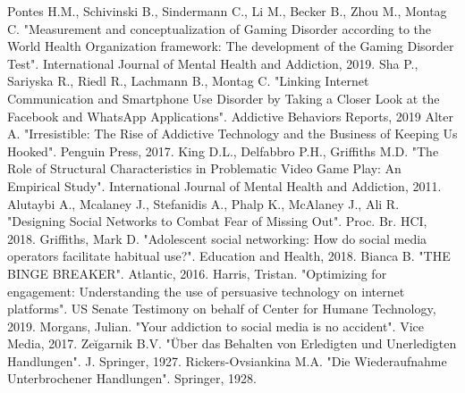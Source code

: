 \documentclass[conference]{IEEEtran}
\begin{document}
\begin{thebibliography}{00}
 Pontes H.M., Schivinski B., Sindermann C., Li M., Becker B., Zhou M., Montag C. "Measurement and conceptualization of Gaming Disorder according to the World Health Organization framework: The development of the Gaming Disorder Test". International Journal of Mental Health and Addiction, 2019.
 Sha P., Sariyska R., Riedl R., Lachmann B., Montag C. "Linking Internet Communication and Smartphone Use Disorder by Taking a Closer Look at the Facebook and WhatsApp Applications". Addictive Behaviors Reports, 2019
 Alter A. "Irresistible: The Rise of Addictive Technology and the Business of Keeping Us Hooked". Penguin Press, 2017.
 King D.L., Delfabbro P.H., Griffiths M.D. "The Role of Structural Characteristics in Problematic Video Game Play: An Empirical Study". International Journal of Mental Health and Addiction, 2011.
 Alutaybi A., Mcalaney J., Stefanidis A., Phalp K., McAlaney J., Ali R. "Designing Social Networks to Combat Fear of Missing Out". Proc. Br. HCI, 2018.
 Griffiths, Mark D. "Adolescent social networking: How do social media operators facilitate habitual use?". Education and Health, 2018.
 Bianca B. "THE BINGE BREAKER". Atlantic, 2016.
 Harris, Tristan. "Optimizing for engagement: Understanding the use of persuasive technology on internet platforms". US Senate Testimony on behalf of Center for Humane Technology, 2019.
 Morgans, Julian. "Your addiction to social media is no accident". Vice Media, 2017.
 Zeĭgarnik B.V. "Über das Behalten von Erledigten und Unerledigten Handlungen". J. Springer, 1927.
 Rickers-Ovsiankina M.A. "Die Wiederaufnahme Unterbrochener Handlungen". Springer, 1928.

\end{thebibliography}
\end{document}
